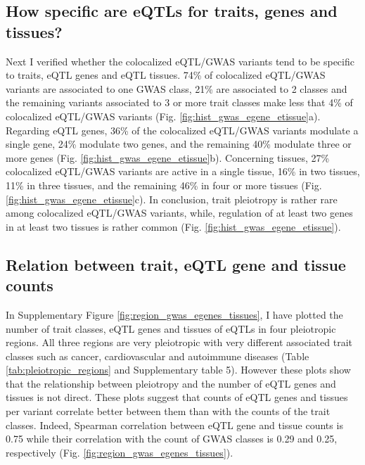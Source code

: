\subsection*{How specific are eQTLs for traits, genes and tissues?}
%

Next I verified whether the colocalized eQTL/GWAS variants tend to be specific to traits, eQTL genes and eQTL tissues.
%
74\% of colocalized eQTL/GWAS variants are associated to one GWAS class, 21\% are associated to 2 classes and the remaining variants associated to
3 or more trait classes make less that 4\% of colocalized eQTL/GWAS variants (Fig. \ref{fig:hist_gwas_egene_etissue}a).
%
Regarding eQTL genes, 36\% of the colocalized eQTL/GWAS variants modulate a single gene, 24\% modulate two genes, and the
remaining 40\% modulate three or more genes (Fig. \ref{fig:hist_gwas_egene_etissue}b).
%
Concerning tissues, 27\% colocalized eQTL/GWAS variants are active in a single tissue, 16\% in two tissues, 11\% in three
tissues, and the remaining 46\% in four or more tissues (Fig. \ref{fig:hist_gwas_egene_etissue}c).
%
In conclusion, trait pleiotropy is rather rare among colocalized eQTL/GWAS variants, while, regulation of at least two
genes in at least two tissues is rather common (Fig. \ref{fig:hist_gwas_egene_etissue}).

%
\subsection*{Relation between trait, eQTL gene and tissue counts}
%

In Supplementary Figure \ref{fig:region_gwas_egenes_tissues}, I have plotted the number of trait classes, eQTL genes and tissues of
eQTLs in four pleiotropic regions.
%
All three regions are very pleiotropic with very different associated trait classes such as cancer, cardiovascular and
autoimmune diseases (Table \ref{tab:pleiotropic_regions} and Supplementary table 5).
%
However these plots show that the relationship between pleiotropy and the number of eQTL genes and tissues is not direct.
%
These plots suggest that counts of eQTL genes and tissues per variant correlate better between them than with the counts of the trait classes.
%
Indeed, Spearman correlation between eQTL gene and tissue counts is 0.75 while their correlation with the count of GWAS classes is 0.29 and 0.25, respectively (Fig. \ref{fig:region_gwas_egenes_tissues}).

